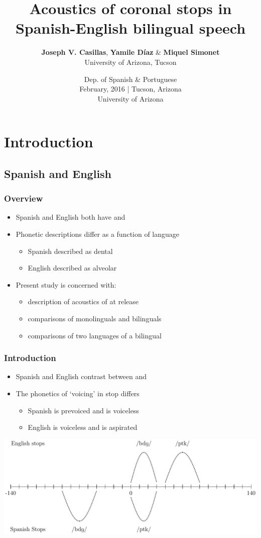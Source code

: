 \documentclass{beamer}
\title[Acoustics of coronal stops]{Acoustics of coronal stops in \\ Spanish-English bilingual speech}
\author[Casillas, D\'{i}az \& Simonet, 2015]{\textbf{Joseph V. Casillas}, \textbf{Yamile D\'{i}az} \& \textbf{Miquel Simonet} \\ University of Arizona, Tucson}
\date{Dep. of Spanish \& Portuguese \\ February, 2016 | Tucson, Arizona \\ University of Arizona}
\begin{document}
\begin{frame}
  \titlepage
\end{frame}

\section{Introduction} %
\label{sec:introduction}

\subsection{Spanish and English}

\begin{frame}
\frametitle{Overview}
\begin{itemize}
	\item Spanish and English both have  and 
	\item Phonetic descriptions differ as a function of language
	\begin{itemize}
		\item Spanish  described as dental
		\item English  described as alveolar
	\end{itemize}
	\item Present study is concerned with:
	\begin{itemize}
		\item description of acoustics of  at release
		\item comparisons of monolinguals and bilinguals
		\item comparisons of two languages of a bilingual
	\end{itemize}
\end{itemize}
\end{frame}

\begin{frame}
\frametitle{Introduction}
\begin{itemize}
	\item Spanish and English contrast between  and 
	\item The phonetics of `voicing' in stop differs
	\begin{itemize}
		\item Spanish  is prevoiced and  is voiceless
		\item English  is voiceless and  is aspirated
	\end{itemize}
\end{itemize}
\begin{center}
	\includegraphics[width=.7\textwidth]{figures/sp_en_stops.pdf}
\end{center}
\end{frame}
\end{document}
